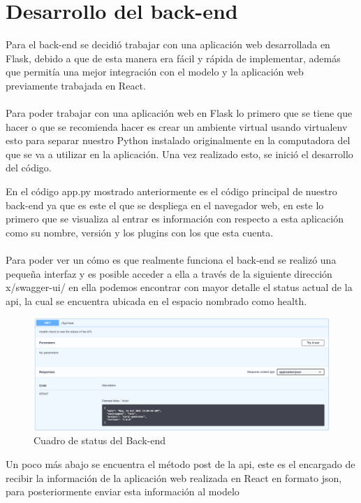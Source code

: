 \documentclass[12pt, a4paper, titlepage]{article}
\begin{document}
	\section{Desarrollo del back-end}
	Para el back-end se decidió trabajar con una aplicación web desarrollada en Flask, debido a que de esta manera era fácil y rápida de implementar, además que permitía una mejor integración con el modelo y la aplicación web previamente trabajada en React.\\\\
	Para poder trabajar con una aplicación web en Flask lo primero que se tiene que hacer o que se recomienda hacer es crear un ambiente virtual usando virtualenv esto para separar nuestro Python instalado originalmente en la computadora del que se va a utilizar en la aplicación. Una vez realizado esto, se inició el desarrollo del código.
	\begin{center}
		
	\end{center}
	En el código app.py mostrado anteriormente es el código principal de nuestro back-end ya que es este el que se despliega en el navegador web, en este lo primero que se visualiza al entrar es información con respecto a esta aplicación como su nombre, versión y los plugins con los que esta cuenta.\\\\
	Para poder ver un cómo es que realmente funciona el back-end se realizó una pequeña interfaz y es posible acceder a ella a través de la siguiente dirección x/swagger-ui/ en ella podemos encontrar con mayor detalle el status actual de la api, la cual se encuentra ubicada en el espacio nombrado como health.
	\begin{figure}[H]
		\includegraphics[width=13.5cm]{./Imagenes/BackEnd/Health.png}
		\centering 
		\caption{Cuadro de status del Back-end}
	\end{figure}
	Un poco más abajo se encuentra el método post de la api, este es el encargado de recibir la información de la aplicación web realizada en React en formato json, para posteriormente enviar esta información al modelo
\end{document}
